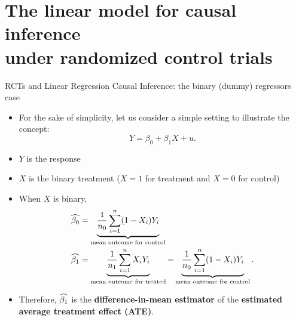 \documentclass[aspectratio=169]{beamer}
\begin{document}


    



\section{\Large The linear model for causal inference \\ under randomized control trials}

\begin{frame}{RCTs and Linear Regression Causal Inference: the binary (dummy) regressors case}

    \begin{itemize}
        \item For the sake of simplicity, let us consider a simple setting to illustrate the concept:
        $$
        Y = \beta_0 + \beta_1 X + u.
        $$
        \item $Y$ is the response
        \item $X$ is the binary treatment ($X = 1$ for treatment and $X = 0$ for control)
        \item When \(X\) is binary,
        \begin{align*}
            \widehat{\beta_0} &= \underbrace{\frac{1}{n_0} \sum_{i=1}^n (1-X_i) Y_i}_{\text{mean outcome for control}} \\
            \widehat{\beta_1} &= \underbrace{\frac{1}{n_1} \sum_{i=1}^n X_i Y_i}_{\text{mean outcome for treated}} - \underbrace{\frac{1}{n_0} \sum_{i=1}^n (1-X_i) Y_i}_{\text{mean outcome for control}}.    
        \end{align*}
    \item Therefore, \(\widehat{\beta_1}\) is the \textbf{difference-in-mean estimator} of the \textbf{estimated average treatment effect (ATE)}.
    \end{itemize}
\end{frame}
\end{document}
